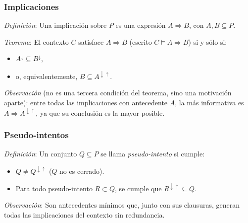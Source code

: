 \documentclass{beamer}
\begin{document}
  \begin{frame}
    \frametitle{Implicaciones}
    \textit{Definición}: Una implicación sobre
    $P$ es una expresión $A \Rightarrow B$, con
    $A, B \subseteq P$.

    \bigskip
    \pause

    \textit{Teorema}: El contexto $C$ satisface
    $A \Rightarrow B$ (escrito $C \models A \Rightarrow B$)
    si y sólo si:

    \pause
    \begin{itemize}[<+->]
      \item $A^\downarrow \subseteq B^\downarrow$,
      \item o, equivalentemente, $B \subseteq A^{\downarrow\uparrow}$.
    \end{itemize}

    \bigskip
    \pause

    \textit{Observación} (no es una tercera condición del
    teorema, sino una motivación aparte): entre todas las
    implicaciones con antecedente $A$, la más informativa es
    $A \Rightarrow A^{\downarrow\uparrow}$, ya que su conclusión
    es la mayor posible.
  \end{frame}

  \begin{frame}
    \frametitle{Pseudo-intentos}
    \textit{Definición}: Un conjunto $Q \subseteq P$
    se llama \textit{pseudo-intento} si cumple:

    \bigskip
    \pause

    \begin{itemize}[<+->]
      \item $Q \neq Q^{\downarrow\uparrow}$
        ($Q$ no es cerrado).
      \item Para todo pseudo-intento $R \subset Q$,
        se cumple que $R^{\downarrow\uparrow} \subseteq Q$.
    \end{itemize}

    \bigskip
    \pause

    \textit{Observación}: Son antecedentes mínimos que,
    junto con sus clausuras, generan todas las
    implicaciones del contexto sin redundancia.
  \end{frame}
\end{document}
